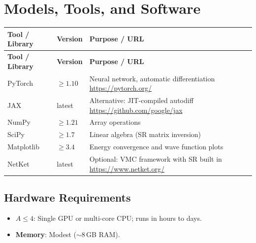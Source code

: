 \documentclass[11pt,a4paper]{article}
\begin{document}
\section{Models, Tools, and Software}

\begin{longtable}{p{4.5cm} p{2.5cm} p{6.5cm}}
\toprule
\textbf{Tool / Library} & \textbf{Version} & \textbf{Purpose / URL} \\
\midrule
\endfirsthead
\toprule
\textbf{Tool / Library} & \textbf{Version} & \textbf{Purpose / URL} \\
\midrule
\endhead
PyTorch & $\geq 1.10$ & Neural network, automatic differentiation \newline \url{https://pytorch.org/} \\
\midrule
JAX & latest & Alternative: JIT-compiled autodiff \newline \url{https://github.com/google/jax} \\
\midrule
NumPy & $\geq 1.21$ & Array operations \\
\midrule
SciPy & $\geq 1.7$ & Linear algebra (SR matrix inversion) \\
\midrule
Matplotlib & $\geq 3.4$ & Energy convergence and wave function plots \\
\midrule
NetKet & latest & Optional: VMC framework with SR built in \newline \url{https://www.netket.org/} \\
\bottomrule
\end{longtable}

\subsection{Hardware Requirements}
\begin{itemize}
  \item \textbf{$A \leq 4$}: Single GPU or multi-core CPU; runs in hours to days.
  \item \textbf{Memory}: Modest ($\sim$8\,GB RAM).
\end{itemize}
\end{document}
